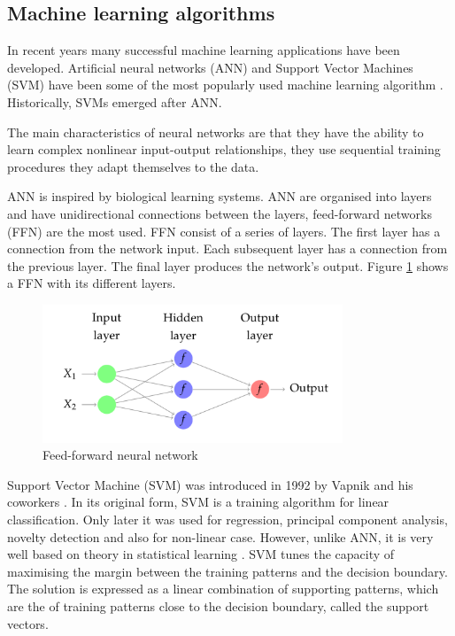\subsection{Machine learning algorithms}
In recent years many successful machine learning applications have been developed. Artificial neural networks (ANN) and Support Vector Machines (SVM) have been some of the most popularly used machine learning algorithm \cite{haykin1998}. Historically, SVMs emerged after ANN.

The main characteristics of neural networks are that they have the ability to learn
complex nonlinear input-output relationships, they use sequential training procedures 
they adapt themselves to the data.

ANN is inspired by biological learning systems. ANN are organised into layers and have unidirectional connections between the layers, feed-forward networks  (FFN) are the most used.  FFN consist of a series of layers. The first layer has a connection from the network input. Each subsequent layer has a connection from the previous layer. The final layer produces the network's output. Figure \ref{fig:ffn} shows a FFN with its different layers.

\begin{figure}[!h]
  \centering
  \includegraphics[width=0.8\textwidth]{img/ffn}
  \caption{Feed-forward neural network}
  \label{fig:ffn}
\end{figure}


Support Vector Machine (SVM) was introduced in 1992 by Vapnik and his coworkers
\cite{boser1992}. In its original form, SVM is a training algorithm for linear classification. Only later it was used for regression, principal component analysis, novelty detection and also for non-linear case.  However, unlike ANN, it is very well 
based on theory in statistical learning \cite{cortes1995}.  SVM tunes the capacity of 
maximising the margin between the training patterns and the decision boundary. The
solution is expressed as a linear combination of supporting patterns, which are the 
of training patterns close to the decision boundary, called the support vectors.

